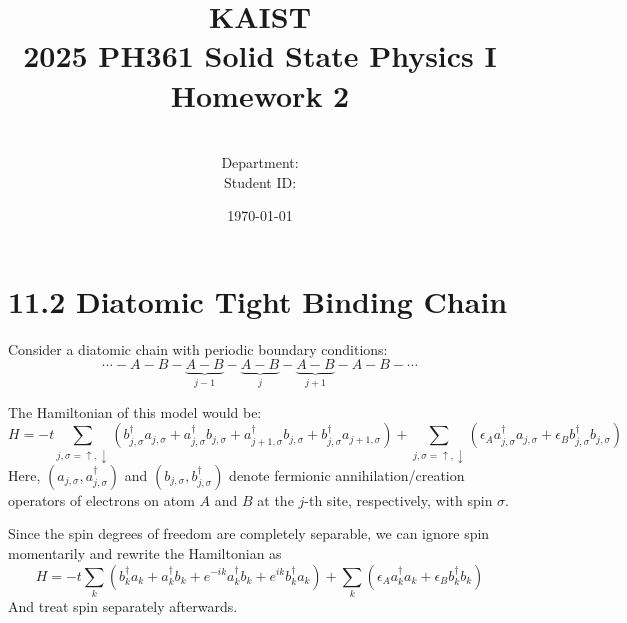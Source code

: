 \documentclass[a4paper,11pt]{article}
\title{KAIST\\2025 PH361 Solid State Physics I\\
Homework 2\bigskip}
\author{\textbf{\Large \name} \\
Department: \department\\
Student ID: \studentid}
\date{\today}
\begin{document}
\thispagestyle{empty}
\maketitle
\tableofcontents
{}

\newcommand{\der}[2][]{\frac{d #1}{d #2}}
\newcommand{\pder}[2][]{\frac{\partial #1}{\partial #2}}
\newcommand{\grad}{\operatorname{grad}}
\newcommand{\diver}{\operatorname{div}}
\newcommand{\curl}{\operatorname{curl}}
\newcommand{\boltz}{k_{\mathrm{B}}}
\newcommand{\tr}{\operatorname{tr}}
\newcommand{\Li}{\operatorname{Li}}
\newcommand{\hc}{\text{h.c.}}
\newcommand{\cc}{\text{c.c.}}

\section{11.2 Diatomic Tight Binding Chain}

Consider a diatomic chain with periodic boundary conditions:
\begin{equation*}
    \cdots-A-B-\underbrace{A-B}_{j-1}-\underbrace{A-B}_j-\underbrace{A-B}_{j+1}-A-B-\cdots
\end{equation*}

The Hamiltonian of this model would be:
\begin{equation}
    H=-t\sum_{j,\sigma=\uparrow, \downarrow}(b_{j,\sigma}^\dagger a_{j,\sigma} + a_{j,\sigma}^\dagger b_{j,\sigma} + a_{j+1,\sigma}^\dagger b_{j,\sigma}+b_{j,\sigma}^\dagger a_{j+1,\sigma}) + \sum_{j,\sigma=\uparrow, \downarrow} \left(\epsilon_Aa_{j,\sigma}^\dagger a_{j,\sigma} + \epsilon_B b_{j,\sigma}^\dagger b_{j,\sigma}\right)
\end{equation}
Here, $(a_{j,\sigma}, a_{j,\sigma}^\dagger)$ and $(b_{j,\sigma}, b_{j,\sigma}^\dagger)$ denote fermionic annihilation/creation operators of electrons on atom $A$ and $B$ at the $j$-th site, respectively, with spin $\sigma$.

Since the spin degrees of freedom are completely separable, we can ignore spin momentarily and rewrite the Hamiltonian as
\begin{equation}
    H
    =-t\sum_{k}(b_k^\dagger a_k + a_k^\dagger b_k+e^{-ik}a_k^\dagger b_k + e^{ik}b_k^\dagger a_k)+\sum_k (\epsilon_A a_k^\dagger a_k + \epsilon_B b_k^\dagger b_k)
\end{equation}
And treat spin separately afterwards.
\end{document}
